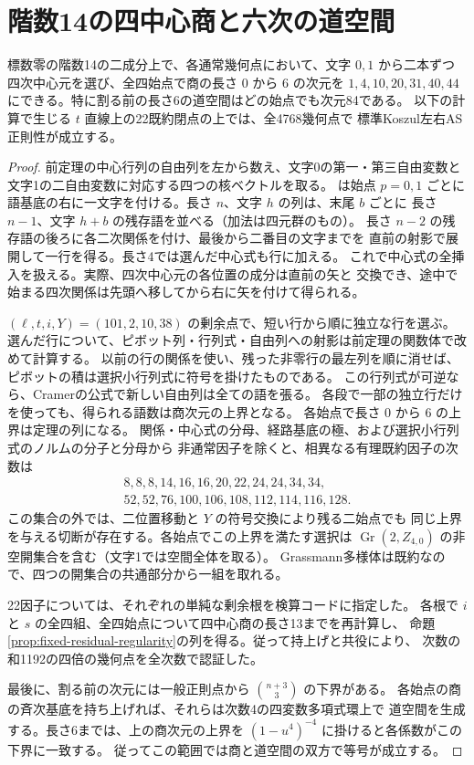 \section{階数14の四中心商と六次の道空間}
\label{sec:rank-fourteen-central-cut}
\begin{theorem}\label{thm:rank-fourteen-central-cut}
標数零の階数14の二成分上で、各通常幾何点において、文字 $0,1$ から二本ずつ
四次中心元を選び、全四始点で商の長さ $0$ から $6$ の次元を
$1,4,10,20,31,40,44$ にできる。特に割る前の長さ6の道空間はどの始点でも次元84である。
以下の計算で生じる $t$ 直線上の22既約閉点の上では、全4768幾何点で
標準Koszul左右AS正則性が成立する。
\end{theorem}
\begin{proof}
前定理の中心行列の自由列を左から数え、文字0の第一・第三自由変数と
文字1の二自由変数に対応する四つの核ベクトルを取る。
 は始点 $p=0,1$ ごとに
語基底の右に一文字を付ける。長さ $n$、文字 $h$ の列は、末尾 $b$ ごとに
長さ $n-1$、文字 $h+b$ の残存語を並べる（加法は四元群のもの）。
長さ $n-2$ の残存語の後ろに各二次関係を付け、最後から二番目の文字までを
直前の射影で展開して一行を得る。長さ4では選んだ中心式も行に加える。
これで中心式の全挿入を扱える。実際、四次中心元の各位置の成分は直前の矢と
交換でき、途中で始まる四次関係は先頭へ移してから右に矢を付けて得られる。

$(\ell,t,i,Y)=(101,2,10,38)$ の剰余点で、短い行から順に独立な行を選ぶ。
選んだ行について、ピボット列・行列式・自由列への射影は前定理の関数体で改めて計算する。
以前の行の関係を使い、残った非零行の最左列を順に消せば、
ピボットの積は選択小行列式に符号を掛けたものである。
この行列式が可逆なら、Cramerの公式で新しい自由列は全ての語を張る。
各段で一部の独立行だけを使っても、得られる語数は商次元の上界となる。
各始点で長さ $0$ から $6$ の上界は定理の列になる。
関係・中心式の分母、経路基底の極、および選択小行列式のノルムの分子と分母から
非通常因子を除くと、相異なる有理既約因子の次数は
\[
\begin{gathered}
8,8,8,14,16,16,20,22,24,24,34,34,\\
52,52,76,100,106,108,112,114,116,128 .
\end{gathered}
\]
この集合の外では、二位置移動と $Y$ の符号交換により残る二始点でも
同じ上界を与える切断が存在する。各始点でこの上界を満たす選択は
$\operatorname{Gr}(2,Z_{4,0})$ の非空開集合を含む（文字1では空間全体を取る）。
Grassmann多様体は既約なので、四つの開集合の共通部分から一組を取れる。

22因子については、それぞれの単純な剰余根を検算コードに指定した。
各根で $i$ と $s$ の全四組、全四始点について四中心商の長さ13までを再計算し、
命題\ref{prop:fixed-residual-regularity}の列を得る。従って持上げと共役により、
次数の和1192の四倍の幾何点を全次数で認証した。

最後に、割る前の次元には一般正則点から $\binom{n+3}{3}$ の下界がある。
各始点の商の斉次基底を持ち上げれば、それらは次数4の四変数多項式環上で
道空間を生成する。長さ6までは、上の商次元の上界を
$(1-u^4)^{-4}$ に掛けると各係数がこの下界に一致する。
従ってこの範囲では商と道空間の双方で等号が成立する。
\end{proof}
